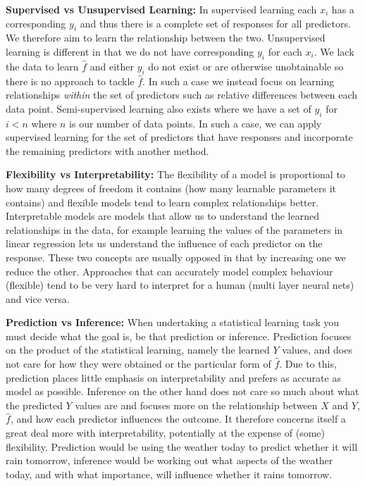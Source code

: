\textbf{Supervised vs Unsupervised Learning:} In supervised learning each $x_{i}$ has a corresponding $y_{i}$ and thus there is a complete set of responses for all predictors. We therefore aim to learn the relationship between the two. Unsupervised learning is different in that we do not have corresponding $y_{i}$ for each $x_{i}$. We lack the data to learn $\hat{f}$ and either $y_{i}$ do not exist or are otherwise unobtainable so there is no approach to tackle $\hat{f}$. In such a case we instead focus on learning relationships \textit{within} the set of predictors such as relative differences between each data point. Semi-supervised learning also exists where we have a set of $y_{i}$ for $i<n$ where $n$ is our number of data points. In such a case, we can apply supervised learning for the set of predictors that have responses and incorporate the remaining predictors with another method.

\textbf{Flexibility vs Interpretability:} The flexibility of a model is proportional to how many degrees of freedom it contains (how many learnable parameters it contains) and flexible models tend to learn complex relationships better. Interpretable models are models that allow us to understand the learned relationships in the data, for example learning the values of the parameters in linear regression lets us understand the influence of each predictor on the response. These two concepts are usually opposed in that by increasing one we reduce the other. Approaches that can accurately model complex behaviour (flexible) tend to be very hard to interpret for a human (multi layer neural nets) and vice versa.

\textbf{Prediction vs Inference:} When undertaking a statistical learning task you must decide what the goal is, be that prediction or inference. Prediction focuses on the product of the statistical learning, namely the learned $Y$ values, and does not care for how they were obtained or the particular form of $\hat{f}$. Due to this, prediction places little emphasis on interpretability and prefers as accurate as model as possible. Inference on the other hand does not care so much about what the predicted $Y$ values are and focuses more on the relationship between $X$ and $Y$, $\hat{f}$, and how each predictor influences the outcome. It therefore concerns itself a great deal more with interpretability, potentially at the expense of (some) flexibility. Prediction would be using the weather today to predict whether it will rain tomorrow, inference would be working out what aspects of the weather today, and with what importance, will influence whether it rains tomorrow.

